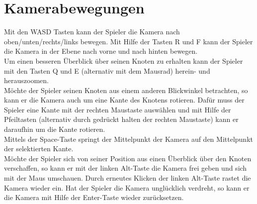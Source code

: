 \documentclass{report}
\begin{document}
\section*{Kamerabewegungen}
Mit den WASD Tasten kann der Spieler die Kamera nach oben/unten/rechts/links bewegen. Mit Hilfe der Tasten R und F kann der Spieler die Kamera in der Ebene nach vorne und nach hinten bewegen.\\
Um einen besseren Überblick über seinen Knoten zu erhalten kann der Spieler mit den Tasten Q und E (alternativ mit dem Mausrad) herein- und herauszoomen.\\
Möchte der Spieler seinen Knoten aus einem anderen Blickwinkel betrachten, so kann er die Kamera auch um eine Kante des Knotens rotieren. Dafür muss der Spieler eine Kante mit der rechten Maustaste auswählen und mit Hilfe der Pfeiltasten (alternativ durch gedrückt halten der rechten Maustaste) kann er daraufhin um die Kante rotieren.\\
Mittels der Space-Taste springt der Mittelpunkt der Kamera auf den Mittelpunkt der selektierten Kante.\\
Möchte der Spieler sich von seiner Position aus einen Überblick über den Knoten verschaffen, so kann er mit der linken Alt-Taste die Kamera frei geben und sich mit der Maus umschauen. Durch erneutes Klicken der linken Alt-Taste rastet die Kamera wieder ein. Hat der Spieler die Kamera unglücklich verdreht, so kann er die Kamera mit Hilfe der Enter-Taste wieder zurücksetzen.
\end{document}
